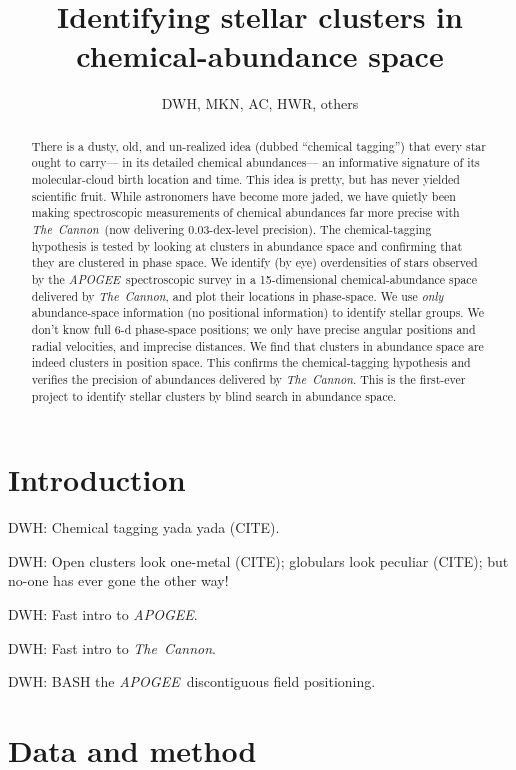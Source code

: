 \documentclass[12pt, letterpaper, preprint]{aastex}
\newcommand{\acronym}[1]{{\small{#1}}}
\newcommand{\project}[1]{\textsl{#1}}
\newcommand{\apogee}{\acronym{\project{APOGEE}}}
\newcommand{\thecannon}{\project{The~Cannon}}
\begin{document}
\title{Identifying stellar clusters in chemical-abundance space}
\author{DWH, MKN, AC, HWR, others}

\begin{abstract}
There is a dusty, old, and un-realized idea (dubbed ``chemical tagging'')
that every star ought to carry---%
in its detailed chemical abundances---%
an informative signature of its molecular-cloud birth location and time.
This idea is pretty, but has never yielded scientific fruit.
While astronomers have become more jaded, we have quietly been making
spectroscopic measurements of chemical abundances far more precise with \thecannon\ 
(now delivering 0.03-dex-level precision).
The chemical-tagging hypothesis is tested by looking at clusters in abundance space
and confirming that they are clustered in phase space.
We identify (by eye) overdensities of stars observed by the \apogee\ spectroscopic survey
in a 15-dimensional chemical-abundance space delivered by \thecannon,
and plot their locations in phase-space.
We use \emph{only} abundance-space information (no positional information) to identify stellar groups.
We don't know full 6-d phase-space positions;
we only have precise angular positions and radial velocities, and imprecise distances.
We find that clusters in abundance space are indeed clusters in position space.
This confirms the chemical-tagging hypothesis and
verifies the precision of abundances delivered by \thecannon.
This is the first-ever project to identify stellar clusters by blind search in abundance space.
\end{abstract}

\section{Introduction}

DWH: Chemical tagging yada yada (CITE).

DWH: Open clusters look one-metal (CITE); globulars look peculiar (CITE); but no-one has ever gone the other way! 

DWH: Fast intro to \apogee.

DWH: Fast intro to \thecannon.

DWH: BASH the \apogee\ discontiguous field positioning.

\section{Data and method}
\end{document}
